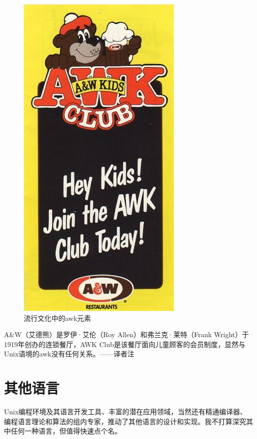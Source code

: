 \documentclass[a4paper,12pt,UTF8,twoside]{ctexbook}
\begin{document}
\begin{figure}[htbp]
	\centering
	\includegraphics[width=0.7\linewidth]{54}
	\caption{流行文化中的awk元素}
	\label{fig:1}
\end{figure}

A\&W（艾德熊）是罗伊·艾伦（Roy Allen）和弗兰克·莱特（Frank Wright）于1919年创办的连锁餐厅，AWK Club是该餐厅面向儿童顾客的会员制度，显然与Unix语境的awk没有任何关系。——译者注

\section{其他语言}

Unix编程环境及其语言开发工具、丰富的潜在应用领域，当然还有精通编译器、编程语言理论和算法的组内专家，推动了其他语言的设计和实现。我不打算深究其中任何一种语言，但值得快速点个名。
\end{document}
